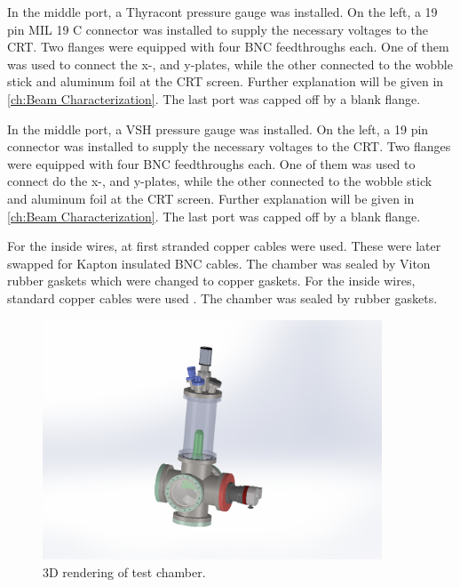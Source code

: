 In the middle port, a Thyracont  pressure gauge was installed. On the left, a 19 pin MIL 19 C connector was installed to supply the necessary voltages to the CRT. Two flanges were equipped with four BNC feedthroughs each. One of them was used to connect the x-, and y-plates, while the other connected to the wobble stick and aluminum foil at the CRT screen. Further explanation will be given in \cref{ch:Beam Characterization}. The last port was capped off by a blank flange.

In the middle port, a VSH   pressure gauge was installed. On the left, a 19 pin connector   was installed to supply the necessary voltages to the CRT. Two flanges were equipped with four BNC feedthroughs each. One of them was used to connect do the x-, and y-plates, while the other connected to the wobble stick and aluminum foil at the CRT screen. Further explanation will be given in \cref{ch:Beam Characterization}. The last port was capped off by a blank flange.
 
For the inside wires, at first stranded copper cables were used. These were later swapped for Kapton insulated BNC cables. The chamber was sealed by Viton rubber gaskets which were changed to copper gaskets.
For the inside wires, standard copper cables were used . The chamber was sealed by rubber  gaskets.
 
\begin{figure}[ht]
	\centering
 	
	\includegraphics[width=0.9\textwidth]{./Chapters/vacuum-chamber/test_chamber} %
	
	\caption{3D rendering of test chamber.}
	\label{fig:3D rendering of test chamber}
\end{figure}
 
